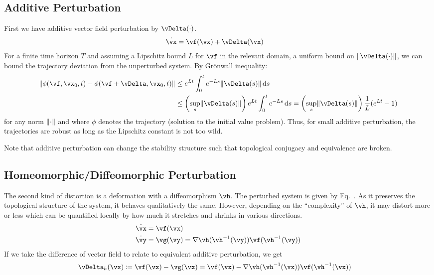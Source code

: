 \documentclass[a4paper,twoside]{article}
\renewcommand{\eqref}{Eq.~\originaleqref}
\newcounter{ct}
\DeclarePairedDelimiter{\norm}{\lVert}{\rVert}
\newcommand{\inv}{^{-1}}
\newcommand{\homeo}{\vh}
\newcommand{\invhomeo}{\homeo\inv}
\begin{document}
\subsection{Additive Perturbation}
First we have additive vector field perturbation by $\vDelta(\cdot)$.
\begin{align}
    \dot{\vx} &= \vf(\vx) + \vDelta(\vx)
\end{align}
For a finite time horizon $T$ and assuming a Lipschitz bound $L$ for $\vf$ in the relevant domain, a uniform bound on $\norm{\vDelta(\cdot)}$, we can bound the trajectory deviation from the unperturbed system.
By Gr\"onwall inequality\cite{Howard2025}:
\begin{align}
    \norm{
	\phi(\vf, \vx_0, t)
	-
	\phi(\vf + \vDelta, \vx_0, t)
    }
    &\leq
	e^{Lt} \int_0^t e^{-Ls} \norm{\vDelta(s)} \,\mathrm{d}s
\\
    &\leq
	\left(\sup_s \norm{\vDelta(s)}\right) e^{Lt} \int_0^t e^{-Ls} \,\mathrm{d}s
    =
	\left(\sup_s \norm{\vDelta(s)}\right) \frac{1}{L} (e^{Lt} - 1)
\end{align}
for any norm $\norm{\cdot}$ and where $\phi$ denotes the trajectory (solution to the initial value problem).
Thus, for small additive perturbation, the trajectories are robust as long as the Lipschitz constant is not too wild.

Note that additive perturbation can change the stability structure such that topological conjugacy and equivalence are broken.

\subsection{Homeomorphic/Diffeomorphic Perturbation}
The second kind of distortion is a deformation with a diffeomorphism $\homeo$.
The perturbed system is given by \eqref{eq:distortion:homeo}.
As it preserves the topological structure of the system, it behaves qualitatively the same.
However, depending on the ``complexity'' of $\homeo$, it may distort more or less which can be quantified locally by how much it stretches and shrinks in various directions.
\begin{align}
    \dot{\vx} &= \vf(\vx)
    \\
    \dot{\vy} &= \vg(\vy)
	= \nabla\homeo(\invhomeo(\vy)) \vf(\invhomeo(\vy))
\end{align}
If we take the difference of vector field to relate to equivalent additive perturbation, we get
\begin{align}
    \vDelta_h(\vx) &\coloneqq \vf(\vx) - \vg(\vx) =
	\vf(\vx) -
	\nabla\homeo(\invhomeo(\vx)) \vf(\invhomeo(\vx))
\end{align}
\end{document}
